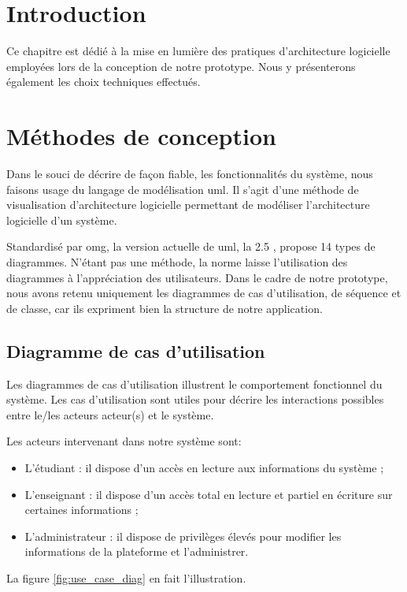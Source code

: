 \section*{Introduction}
Ce chapitre est dédié à la mise en lumière des pratiques d’architecture logicielle 
employées lors de la conception de notre prototype. 
Nous y présenterons également les choix techniques effectués.

\section{Méthodes de conception}
Dans le souci de décrire de façon fiable, les fonctionnalités du système, nous faisons usage du langage de modélisation \acrshort{uml}. 
Il s’agit d’une méthode de visualisation d’architecture logicielle permettant de modéliser 
l’architecture logicielle d’un système.

Standardisé par \acrshort{omg}, la version actuelle de \acrshort{uml}, la 2.5 \cite{uml_spec_link}, propose 14 types de diagrammes. 
N'étant pas une méthode, la norme laisse l’utilisation des diagrammes à l'appréciation des utilisateurs.
Dans le cadre de notre prototype, nous avons retenu uniquement les diagrammes de cas d’utilisation, 
de séquence et de classe, car ils expriment bien la structure de notre application.

\subsection{Diagramme de cas d’utilisation}
Les diagrammes de cas d’utilisation illustrent le comportement fonctionnel du système. 
Les cas d’utilisation sont utiles pour décrire les interactions possibles entre 
le/les acteurs acteur(s) et le système.
 
Les acteurs intervenant dans notre système sont:

\begin{itemize}
  \item L’étudiant : il dispose d’un accès en lecture aux informations du système ;
  \item L’enseignant : il dispose d’un accès total en lecture et partiel en écriture sur certaines informations ;
  \item L’administrateur : il dispose de privilèges élevés pour modifier les informations de la plateforme et l’administrer.
\end{itemize}

La figure \ref{fig:use_case_diag} en fait l'illustration.

